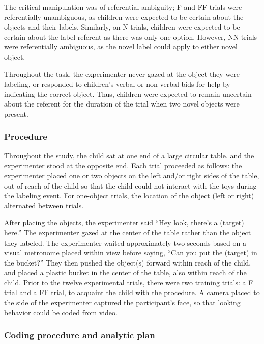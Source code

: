\documentclass[english,man]{apa6}
\theoremstyle{definition}
\theoremstyle{definition}
\theoremstyle{definition}
\theoremstyle{remark}
\begin{document}
The critical manipulation was of referential ambiguity; F and FF trials
were referentially unambiguous, as children were expected to be certain
about the objects and their labels. Similarly, on N trials, children
were expected to be certain about the label referent as there was only
one option. However, NN trials were referentially ambiguous, as the
novel label could apply to either novel object.

Throughout the task, the experimenter never gazed at the object they
were labeling, or responded to children's verbal or non-verbal bids for
help by indicating the correct object. Thus, children were expected to
remain uncertain about the referent for the duration of the trial when
two novel objects were present.

\subsubsection{Procedure}\label{procedure}

Throughout the study, the child sat at one end of a large circular
table, and the experimenter stood at the opposite end. Each trial
proceeded as follows: the experimenter placed one or two objects on the
left and/or right sides of the table, out of reach of the child so that
the child could not interact with the toys during the labeling event.
For one-object trials, the location of the object (left or right)
alternated between trials.

After placing the objects, the experimenter said \enquote{Hey look,
there's a (target) here.} The experimenter gazed at the center of the
table rather than the object they labeled. The experimenter waited
approximately two seconds based on a visual metronome placed within view
before saying, \enquote{Can you put the (target) in the bucket?} They
then pushed the object(s) forward within reach of the child, and placed
a plastic bucket in the center of the table, also within reach of the
child. Prior to the twelve experimental trials, there were two training
trials: a F trial and a FF trial, to acquaint the child with the
procedure. A camera placed to the side of the experimenter captured the
participant's face, so that looking behavior could be coded from video.

\subsubsection{Coding procedure and analytic
plan}\label{coding-procedure-and-analytic-plan}
\end{document}
